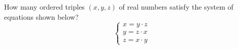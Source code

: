 How many ordered triples $(x, y, z)$ of real numbers satisfy the system of equations shown below? \[\begin{cases} x = y \cdot z \\
y = z \cdot x \\
z = x \cdot y \end{cases}\]
